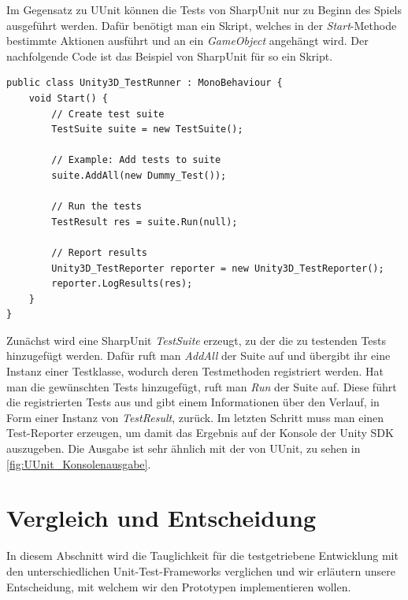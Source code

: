 Im Gegensatz zu UUnit können die Tests von SharpUnit nur zu Beginn des Spiels ausgeführt werden. Dafür benötigt man ein Skript, welches in der \textit{Start}-Methode bestimmte Aktionen ausführt und an ein \textit{GameObject} angehängt wird. Der nachfolgende Code ist das Beispiel von SharpUnit für so ein Skript.
\pagebreak

\begin{lstlisting}[caption={[Einbindung der Tests mit SharpUnit]Einbindung der Tests mit SharpUnit\\
Quelle: Demo von SharpUnit, erhältlich unter \url{https://github.com/mgants4/SharpUnit}.}, label=code:SharpUnitTestRunner]
public class Unity3D_TestRunner : MonoBehaviour {
	void Start() {
        // Create test suite
        TestSuite suite = new TestSuite();

        // Example: Add tests to suite
        suite.AddAll(new Dummy_Test());

        // Run the tests
        TestResult res = suite.Run(null);

        // Report results
        Unity3D_TestReporter reporter = new Unity3D_TestReporter();
        reporter.LogResults(res);
	}
}
\end{lstlisting}

Zunächst wird eine SharpUnit \textit{TestSuite} erzeugt, zu der die zu testenden Tests hinzugefügt werden. Dafür ruft man \textit{AddAll} der Suite auf und übergibt ihr eine Instanz einer Testklasse, wodurch deren Testmethoden registriert werden. Hat man die gewünschten Tests hinzugefügt, ruft man \textit{Run} der Suite auf. Diese führt die registrierten Tests aus und gibt einem Informationen über den Verlauf, in Form einer Instanz von \textit{TestResult}, zurück. Im letzten Schritt muss man einen Test-Reporter erzeugen, um damit das Ergebnis auf der Konsole der Unity SDK auszugeben. Die Ausgabe ist sehr ähnlich mit der von UUnit, zu sehen in \autoref{fig:UUnit_Konsolenausgabe}.
\pagebreak

\section{Vergleich und Entscheidung}\label{sec:Vergleich_und_Entscheidung}

In diesem Abschnitt wird die Tauglichkeit für die testgetriebene Entwicklung mit den unterschiedlichen Unit-Test-Frameworks verglichen und wir erläutern unsere Entscheidung, mit welchem wir den Prototypen implementieren wollen.

